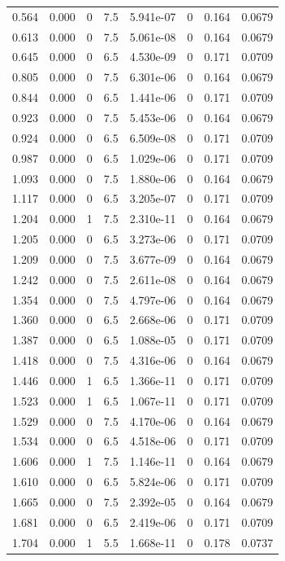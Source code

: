 \documentclass[preview]{standalone}
\begin{document}
{{\begin{tabular}{L{1.2cm}C{1.2cm} C{0.3cm}C{0.5cm} C{1.4cm}C{1.4cm} C{1.4cm}C{1.4cm}}
  0.564  &  0.000  & 0     & 7.5 &  5.941e-07  & 0  & 0.164 &  0.0679   \\ 
  0.613  &  0.000  & 0     & 7.5 &  5.061e-08  & 0  & 0.164 &  0.0679   \\ 
  0.645  &  0.000  & 0     & 6.5 &  4.530e-09  & 0  & 0.171 &  0.0709   \\ 
  0.805  &  0.000  & 0     & 7.5 &  6.301e-06  & 0  & 0.164 &  0.0679   \\ 
  0.844  &  0.000  & 0     & 6.5 &  1.441e-06  & 0  & 0.171 &  0.0709   \\ 
  0.923  &  0.000  & 0     & 7.5 &  5.453e-06  & 0  & 0.164 &  0.0679   \\ 
  0.924  &  0.000  & 0     & 6.5 &  6.509e-08  & 0  & 0.171 &  0.0709   \\ 
  0.987  &  0.000  & 0     & 6.5 &  1.029e-06  & 0  & 0.171 &  0.0709   \\ 
  1.093  &  0.000  & 0     & 7.5 &  1.880e-06  & 0  & 0.164 &  0.0679   \\ 
  1.117  &  0.000  & 0     & 6.5 &  3.205e-07  & 0  & 0.171 &  0.0709   \\ 
  1.204  &  0.000  & 1     & 7.5 &  2.310e-11  & 0  & 0.164 &  0.0679   \\ 
  1.205  &  0.000  & 0     & 6.5 &  3.273e-06  & 0  & 0.171 &  0.0709   \\ 
  1.209  &  0.000  & 0     & 7.5 &  3.677e-09  & 0  & 0.164 &  0.0679   \\ 
  1.242  &  0.000  & 0     & 7.5 &  2.611e-08  & 0  & 0.164 &  0.0679   \\ 
  1.354  &  0.000  & 0     & 7.5 &  4.797e-06  & 0  & 0.164 &  0.0679   \\ 
  1.360  &  0.000  & 0     & 6.5 &  2.668e-06  & 0  & 0.171 &  0.0709   \\ 
  1.387  &  0.000  & 0     & 6.5 &  1.088e-05  & 0  & 0.171 &  0.0709   \\ 
  1.418  &  0.000  & 0     & 7.5 &  4.316e-06  & 0  & 0.164 &  0.0679   \\ 
  1.446  &  0.000  & 1     & 6.5 &  1.366e-11  & 0  & 0.171 &  0.0709   \\ 
  1.523  &  0.000  & 1     & 6.5 &  1.067e-11  & 0  & 0.171 &  0.0709   \\ 
  1.529  &  0.000  & 0     & 7.5 &  4.170e-06  & 0  & 0.164 &  0.0679   \\ 
  1.534  &  0.000  & 0     & 6.5 &  4.518e-06  & 0  & 0.171 &  0.0709   \\ 
  1.606  &  0.000  & 1     & 7.5 &  1.146e-11  & 0  & 0.164 &  0.0679   \\ 
  1.610  &  0.000  & 0     & 6.5 &  5.824e-06  & 0  & 0.171 &  0.0709   \\ 
  1.665  &  0.000  & 0     & 7.5 &  2.392e-05  & 0  & 0.164 &  0.0679   \\ 
  1.681  &  0.000  & 0     & 6.5 &  2.419e-06  & 0  & 0.171 &  0.0709   \\ 
  1.704  &  0.000  & 1     & 5.5 &  1.668e-11  & 0  & 0.178 &  0.0737   \\ 
\hline 
\end{tabular} 

}}
\end{document}
